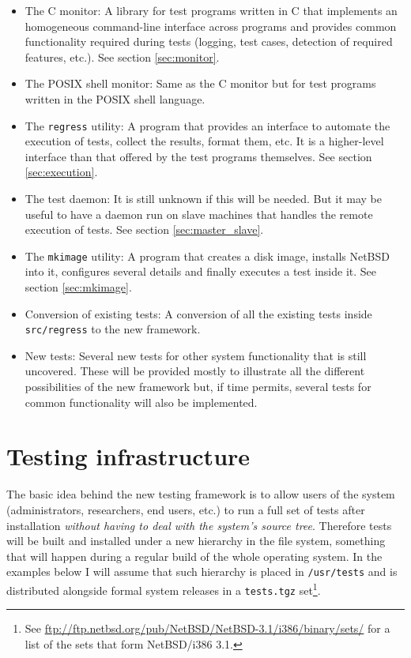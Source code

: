 \documentclass[a4paper,10pt]{article}
\begin{document}
\begin{itemize}

\item The C monitor: A library for test programs written in C that
implements an homogeneous command-line interface across programs and
provides common functionality required during tests (logging, test cases,
detection of required features, etc.).  See section \ref{sec:monitor}.

\item The POSIX shell monitor: Same as the C monitor but for test programs
written in the POSIX shell language.

\item The \verb*|regress| utility: A program that provides an interface to
automate the execution of tests, collect the results, format them, etc. 
It is a higher-level interface than that offered by the test programs
themselves.  See section \ref{sec:execution}.

\item The test daemon: It is still unknown if this will be needed.  But it
may be useful to have a daemon run on slave machines that handles the
remote execution of tests.  See section \ref{sec:master_slave}.

\item The \verb*|mkimage| utility: A program that creates a disk image,
installs NetBSD into it, configures several details and finally executes a
test inside it.  See section \ref{sec:mkimage}.

\item Conversion of existing tests: A conversion of all the existing tests
inside \verb*|src/regress| to the new framework.

\item New tests: Several new tests for other system functionality that is
still uncovered.  These will be provided mostly to illustrate all the
different possibilities of the new framework but, if time permits, several
tests for common functionality will also be implemented.

\end{itemize}


\section{Testing infrastructure}

The basic idea behind the new testing framework is to allow users of the
system (administrators, researchers, end users, etc.) to run a full set of
tests after installation \emph{without having to deal with the system's
source tree}.  Therefore tests will be built and installed under a new
hierarchy in the file system, something that will happen during a regular
build of the whole operating system.  In the examples below I will assume
that such hierarchy is placed in \verb*|/usr/tests| and is distributed
alongside formal system releases in a \verb*|tests.tgz|
set\footnote{See
\url{ftp://ftp.netbsd.org/pub/NetBSD/NetBSD-3.1/i386/binary/sets/} for a
list of the sets that form NetBSD/i386 3.1.}.
\end{document}

